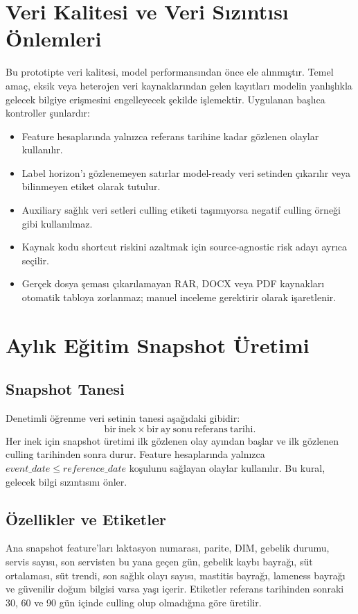 \documentclass[conference]{IEEEtran}
\begin{document}
\section{Veri Kalitesi ve Veri Sızıntısı Önlemleri}
Bu prototipte veri kalitesi, model performansından önce ele alınmıştır. Temel
amaç, eksik veya heterojen veri kaynaklarından gelen kayıtları modelin
yanlışlıkla gelecek bilgiye erişmesini engelleyecek şekilde işlemektir.
Uygulanan başlıca kontroller şunlardır:
\begin{itemize}
    \item Feature hesaplarında yalnızca referans tarihine kadar gözlenen olaylar
    kullanılır.
    \item Label horizon'ı gözlenemeyen satırlar model-ready veri setinden
    çıkarılır veya bilinmeyen etiket olarak tutulur.
    \item Auxiliary sağlık veri setleri culling etiketi taşımıyorsa negatif
    culling örneği gibi kullanılmaz.
    \item Kaynak kodu shortcut riskini azaltmak için source-agnostic risk
    adayı ayrıca seçilir.
    \item Gerçek dosya şeması çıkarılamayan RAR, DOCX veya PDF kaynakları
    otomatik tabloya zorlanmaz; manuel inceleme gerektirir olarak işaretlenir.
\end{itemize}

\section{Aylık Eğitim Snapshot Üretimi}
\subsection{Snapshot Tanesi}
Denetimli öğrenme veri setinin tanesi aşağıdaki gibidir:
\begin{equation}
    \mathrm{bir\ inek} \times \mathrm{bir\ ay\ sonu\ referans\ tarihi}.
\end{equation}
Her inek için snapshot üretimi ilk gözlenen olay ayından başlar ve ilk gözlenen
culling tarihinden sonra durur. Feature hesaplarında yalnızca
\(event\_date \leq reference\_date\) koşulunu sağlayan olaylar kullanılır. Bu
kural, gelecek bilgi sızıntısını önler.

\subsection{Özellikler ve Etiketler}
Ana snapshot feature'ları laktasyon numarası, parite, DIM, gebelik durumu,
servis sayısı, son servisten bu yana geçen gün, gebelik kaybı bayrağı, süt
ortalaması, süt trendi, son sağlık olayı sayısı, mastitis bayrağı, lameness
bayrağı ve güvenilir doğum bilgisi varsa yaşı içerir. Etiketler referans
tarihinden sonraki 30, 60 ve 90 gün içinde culling olup olmadığına göre
üretilir.
\end{document}
